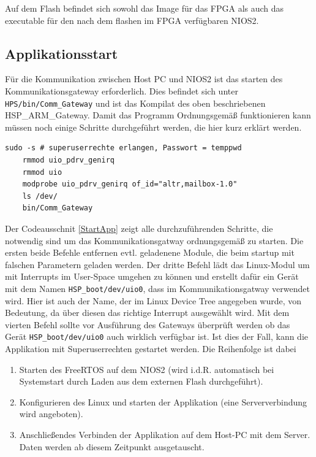 Auf dem Flash befindet sich sowohl das Image für das \ac{FPGA} als auch das executable für den nach dem flashen im \ac{FPGA} verfügbaren NIOS2.
\subsection{Applikationsstart}
Für die Kommunikation zwischen Host PC und NIOS2 ist das starten des Kommunikationsgateway erforderlich. Dies befindet sich unter \texttt{HPS/bin/Comm\_Gateway} und ist das Kompilat des oben beschriebenen HSP\_ARM\_Gateway. Damit das Programm Ordnungsgemäß funktionieren kann müssen noch einige Schritte durchgeführt werden, die hier kurz erklärt werden.

\lstset{language=bash}
\begin{lstlisting}[caption=Listing, label={StartApp}]
	sudo -s # superuserrechte erlangen, Passwort = temppwd
	rmmod uio_pdrv_genirq
	rmmod uio
	modprobe uio_pdrv_genirq of_id="altr,mailbox-1.0"
	ls /dev/
	bin/Comm_Gateway
\end{lstlisting}

Der Codeausschnit \ref{StartApp} zeigt alle durchzuführenden Schritte, die notwendig sind um das Kommunikationsgatway ordnungsgemäß zu starten. Die ersten beide Befehle entfernen evtl. geladenene Module, die beim startup mit falschen Parametern geladen werden. Der dritte Befehl lädt das Linux-Modul um mit Interrupts im User-Space umgehen zu können und erstellt dafür ein Gerät mit dem Namen \texttt{HSP\_boot/dev/uio0}, dass im Kommunikationsgatway verwendet wird. Hier ist auch der Name, der im Linux Device Tree angegeben wurde, von Bedeutung, da über diesen das richtige Interrupt ausgewählt wird. Mit dem vierten Befehl sollte vor Ausführung des Gateways überprüft werden ob das Gerät \texttt{HSP\_boot/dev/uio0} auch wirklich verfügbar ist. Ist dies der Fall, kann die Applikation mit Superuserrechten gestartet werden. Die Reihenfolge ist dabei
\begin{enumerate}
	\item Starten des FreeRTOS auf dem NIOS2 (wird i.d.R. automatisch bei Systemstart durch Laden aus dem externen Flash durchgeführt).
	\item Konfigurieren des Linux und starten der Applikation (eine Serververbindung wird angeboten).
	\item Anschließendes Verbinden der Applikation auf dem Host-PC mit dem Server. Daten werden ab diesem Zeitpunkt ausgetauscht.
\end{enumerate}

